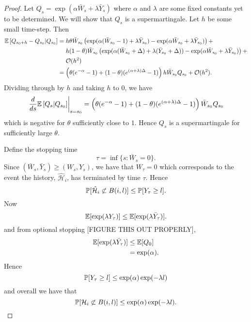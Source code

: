 \begin{proof}
Let $Q_s = \exp \left(\alpha \bar{W}_s + \lambda \bar{Y}_s \right)$ where $\alpha$ and $\lambda$ are some fixed constants yet to be determined. We will show that $Q_s$ is a supermartingale. Let $h$ be some small time-step. Then
\begin{align}
	\mathbb{E}\left[Q_{s_0 + h} - Q_{s_0}| Q_{s_0}\right] &= h \theta \bar{W}_{s_0} \left(\exp(\alpha (\bar{W}_{s_0} - 1) + \lambda \bar{Y}_{s_0}) - \exp(\alpha \bar{W}_{s_0} + \lambda \bar{Y}_{s_0})\right) + \\
	&\hphantom{= .} h (1 - \theta) \bar{W}_{s_0} \left( \exp(\alpha (\bar{W}_{s_0} + \Delta) + \lambda (\bar{Y}_{s_0} + \Delta)) - \exp(\alpha \bar{W}_{s_0} + \lambda \bar{Y}_{s_0}) \right) + \notag\\
	&\hphantom{= .} \mathcal{O}(h^2) \notag\\
	&= \left(\theta (e^{-\alpha} - 1) + (1 - \theta)(e^{(\alpha + \lambda)\Delta} - 1)\right)h \bar{W}_{s_0} Q_{s_0} + \mathcal{O}(h^2).
\end{align}
Dividing through by $h$ and taking $h$ to $0$, we have
\begin{equation}
	\left.\frac{d}{ds} \mathbb{E}\left[Q_{s} | Q_{s_0}\right] \right|_{s = s_0} = \left(\theta (e^{-\alpha} - 1) + (1 - \theta)(e^{(\alpha + \lambda)\Delta} - 1)\right)\bar{W}_{s_0} Q_{s_0}
\end{equation}
which is negative for $\theta$ sufficiently close to $1$. Hence $Q_s$ is a supermartingale for sufficiently large $\theta$.

Define the stopping time 
\begin{equation}
	\tau = \inf\{s: \bar{W}_s = 0\}.
\end{equation}
Since $(\bar{W}_s, \bar{Y}_s) \geq (W_s, Y_s)$, we have that $W_\tau = 0$ which corresponds to the event the history, $\hat{\mathcal{H}}_i$, has terminated by time $\tau$. Hence
\begin{equation}
	\mathbb{P}[\hat{\mathcal{H}}_{i} \not\subset B(i, l)] \leq \mathbb{P}[Y_\tau \geq l].
\end{equation}
Now
\begin{equation}
	\mathbb{E}[\exp(\lambda Y_\tau)] \leq \mathbb{E}[\exp(\lambda\bar{Y}_\tau)].
\end{equation}
and from optional stopping [FIGURE THIS OUT PROPERLY],
\begin{align}
	\mathbb{E}[\exp(\lambda \bar{Y}_\tau )] &\leq \mathbb{E}[Q_{0}]\\
	&= \exp(\alpha).
\end{align}
Hence 
\begin{equation}
	\mathbb{P}[Y_\tau \geq l] \leq \exp(\alpha) \exp(-\lambda l)
\end{equation}
and overall we have that
\begin{equation}
	\mathbb{P}[\mathcal{H}_i \not\subset B(i, l)] \leq \exp(\alpha) \exp(-\lambda l).
\end{equation}
\end{proof}
